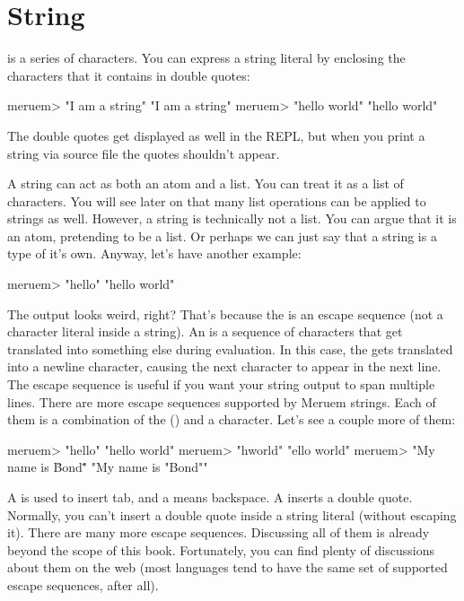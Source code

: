 \section{String}
\label{sec:string}
 is a series of characters. You can express a string literal by enclosing the characters that it contains in double quotes:

\begin{REPL}
meruem> "I am a string"
"I am a string"
meruem> "hello world"
"hello world"
\end{REPL}

The double quotes get displayed as well in the REPL, but when you print a string via source file the quotes shouldn't appear. 

A string can act as both an atom and a list. You can treat it as a list of characters. You will see later on that many list operations can be applied to strings as well. However, a string is technically not a list. You can argue that it is an atom, pretending to be a list. Or perhaps we can just say that a string is a type of it's own. Anyway, let's have another example:

\begin{REPL}
meruem> "hello\nworld"
"hello
world"
\end{REPL}

The output looks weird, right? That's because the  is an escape sequence (not a character literal inside a string). An  is a sequence of characters that get translated into something else during evaluation. In this case, the  gets translated into a newline character, causing the next character to appear in the next line. The escape sequence  is useful if you want your string output to span multiple lines. There are more escape sequences supported by Meruem strings. Each of them is a combination of the  (\code{\textbackslash}) and a character. Let's see a couple more of them:

\begin{REPL}
meruem> "hello\tworld"
"hello	world"
meruem> "h\bello world"
"ello world"
meruem> "My name is \"Bond\""
"My name is "Bond""
\end{REPL}

A  is used to insert tab, and a  means backspace. A  inserts a double quote. Normally, you can't insert a double quote inside a string literal (without escaping it). There are many more escape sequences. Discussing all of them is already beyond the scope of this book. Fortunately, you can find plenty of discussions about them on the web (most languages tend to have the same set of supported escape sequences, after all). 

